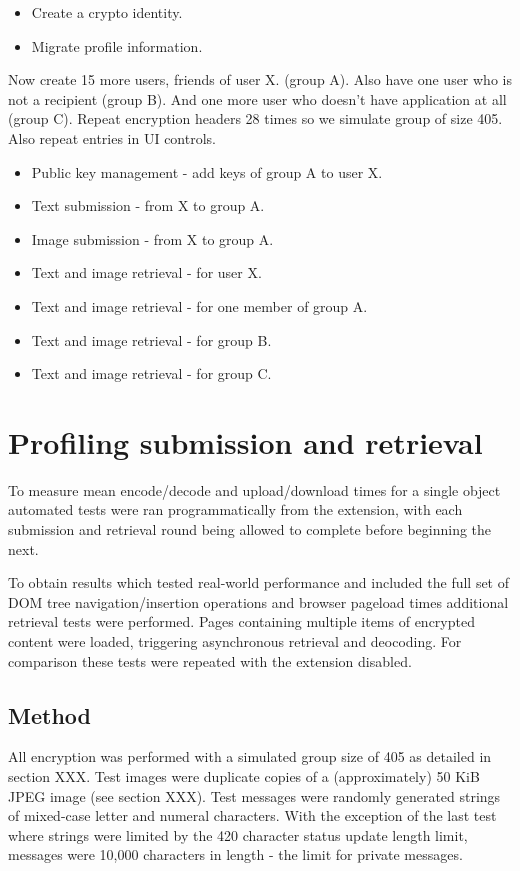 \begin{itemize}
    \item Create a crypto identity.
    \item Migrate profile information.
\end{itemize}

Now create 15 more users, friends of user X. (group A). Also have one user who is not a recipient (group B). And one more user who doesn't have application at all (group C). Repeat encryption headers 28 times so we simulate group of size 405. Also repeat entries in UI controls.

\begin{itemize}
    \item Public key management - add keys of group A to user X.
    \item Text submission - from X to group A.
    \item Image submission - from X to group A.
    \item Text and image retrieval - for user X.
    \item Text and image retrieval - for one member of group A.
    \item Text and image retrieval - for group B.
    \item Text and image retrieval - for group C.
\end{itemize}

\section{Profiling submission and retrieval}

To measure mean encode/decode and upload/download times for a single object automated tests were ran programmatically from the extension, with each submission and retrieval round being allowed to complete before beginning the next.

To obtain results which tested real-world performance and included the full set of DOM tree navigation/insertion operations and browser pageload times additional retrieval tests were performed. Pages containing multiple items of encrypted content were loaded, triggering asynchronous retrieval and deocoding. For comparison these tests were repeated with the extension disabled.

\subsection{Method}

All encryption was performed with a simulated group size of 405 as detailed in section XXX. Test images were duplicate copies of a (approximately) 50 KiB JPEG image (see section XXX). Test messages were randomly generated strings of mixed-case letter and numeral characters. With the exception of the last test where strings were limited by the 420 character status update length limit, messages were 10,000 characters in length - the limit for private messages.

